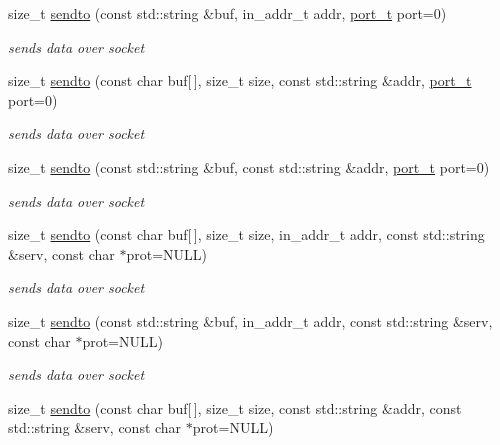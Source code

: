 \begin{CompactItemize}
\begin{CompactItemize}
size\_\-t \hyperlink{classsocketpp_1_1BaseSocket_d12e08b6f67a95a3181403c70f306f88}{sendto} (const std::string \&buf, in\_\-addr\_\-t addr, \hyperlink{namespacesocketpp_5517ef80f249b891a2ba64b95fc1e723}{port\_\-t} port=0)
\begin{CompactList}\small\item\em sends data over socket \item\end{CompactList}\item 
size\_\-t \hyperlink{classsocketpp_1_1BaseSocket_2b591cefe9fd8ac9f46ed7fbdd8caa82}{sendto} (const char buf\mbox{[}$\,$\mbox{]}, size\_\-t size, const std::string \&addr, \hyperlink{namespacesocketpp_5517ef80f249b891a2ba64b95fc1e723}{port\_\-t} port=0)
\begin{CompactList}\small\item\em sends data over socket \item\end{CompactList}\item 
size\_\-t \hyperlink{classsocketpp_1_1BaseSocket_8f98eff253e52ccf3463a0379a10caf2}{sendto} (const std::string \&buf, const std::string \&addr, \hyperlink{namespacesocketpp_5517ef80f249b891a2ba64b95fc1e723}{port\_\-t} port=0)
\begin{CompactList}\small\item\em sends data over socket \item\end{CompactList}\item 
size\_\-t \hyperlink{classsocketpp_1_1BaseSocket_0154d562be27c8b2aa074d5f6bb8ab03}{sendto} (const char buf\mbox{[}$\,$\mbox{]}, size\_\-t size, in\_\-addr\_\-t addr, const std::string \&serv, const char $\ast$prot=NULL)
\begin{CompactList}\small\item\em sends data over socket \item\end{CompactList}\item 
size\_\-t \hyperlink{classsocketpp_1_1BaseSocket_4afc9ac34b702af852f2b52e68a90c3e}{sendto} (const std::string \&buf, in\_\-addr\_\-t addr, const std::string \&serv, const char $\ast$prot=NULL)
\begin{CompactList}\small\item\em sends data over socket \item\end{CompactList}\item 
size\_\-t \hyperlink{classsocketpp_1_1BaseSocket_c0bbca9725a55a2e6a822536efd31b73}{sendto} (const char buf\mbox{[}$\,$\mbox{]}, size\_\-t size, const std::string \&addr, const std::string \&serv, const char $\ast$prot=NULL)

\end{CompactItemize}
\end{CompactItemize}

